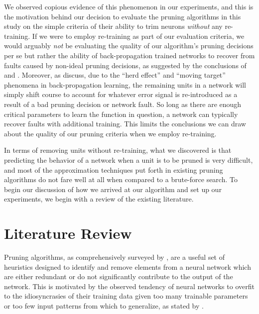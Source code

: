 We observed copious evidence of this phenomenon in our experiments, and this is the motivation behind our decision to evaluate the pruning algorithms in this study on the simple criteria of their ability to trim neurons \textit{without} any re-training. If we were to employ re-training as part of our evaluation criteria, we would arguably \textit{not} be evaluating the quality of our algorithm's pruning decisions per se but rather the ability of back-propagation trained networks to recover from faults caused by non-ideal pruning decisions, as suggested by the conclusions of \cite{segee1991fault} and \cite{mozer1989skeletonization}. Moreover, as \cite{fahlman1989cascade} discuss, due to the ``herd effect'' and ``moving target'' phenomena in back-propagation learning, the remaining units in a network will simply shift course to account for whatever error signal is re-introduced as a result of a bad pruning decision or network fault. So long as there are enough critical parameters to learn the function in question, a network can typically recover faults with additional training. This limits the conclusions we can draw about the quality of our pruning criteria when we employ re-training. 

In terms of removing units without re-training, what we discovered is that predicting the behavior of a network when a unit is to be pruned is very difficult, and most of the approximation techniques put forth in existing pruning algorithms do not fare well at all when compared to a brute-force search. To begin our discussion of how we arrived at our algorithm and set up our experiments, we begin with a review of the existing literature.

\section{Literature Review}
Pruning algorithms, as comprehensively surveyed by \cite{reed1993pruning}, are a useful set of heuristics designed to identify and remove elements from a neural network which are either redundant or do not significantly contribute to the output of the network. This is motivated by the observed tendency of neural networks to overfit to the idiosyncrasies of their training data given too many trainable parameters or too few input patterns from which to generalize, as stated by \cite{chauvin1990generalization}. 

